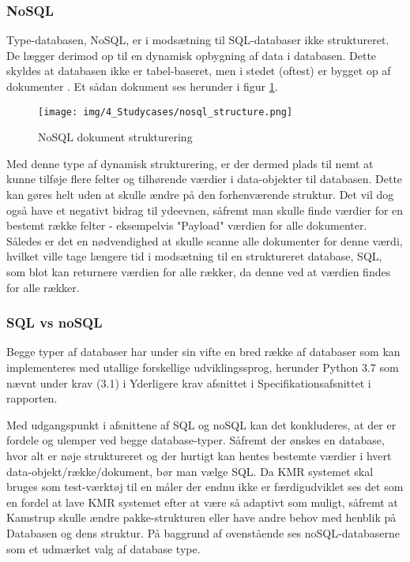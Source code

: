 \begin{appendices}
\subsubsection{NoSQL}
Type-databasen, NoSQL, er i modsætning til SQL-databaser ikke struktureret. De lægger derimod op til en dynamisk opbygning af data i databasen. Dette skyldes at databasen ikke er tabel-baseret, men i stedet (oftest) er bygget op af dokumenter \cite{nosql_explained}. \newline
Et sådan dokument ses herunder i figur \ref{fig:no_sql_document_strukturering}. 

\begin{figure}[H]
	\centering{}
	\texttt{[image: img/4\_Studycases/nosql\_structure.png]}
	\caption{NoSQL dokument strukturering}
	\label{fig:no_sql_document_strukturering}
\end{figure} 

Med denne type af dynamisk strukturering, er der dermed plads til nemt at kunne tilføje flere felter og tilhørende værdier i data-objekter til databasen. Dette kan gøres helt uden at skulle ændre på den forhenværende struktur. Det vil dog også have et negativt bidrag til ydeevnen, såfremt man skulle finde værdier for en bestemt række felter - eksempelvis "Payload" værdien for alle dokumenter. Således er det en nødvendighed at skulle scanne alle dokumenter for denne værdi, hvilket ville tage længere tid i modsætning til en struktureret database, SQL, som blot kan returnere værdien for alle rækker, da denne ved at værdien findes for alle rækker. \cite{nosql_explained}

\subsubsection{SQL vs noSQL}
Begge typer af databaser har under sin vifte en bred række af databaser som kan implementeres med utallige forskellige udviklingssprog, herunder Python 3.7 som nævnt under krav (3.1) i Yderligere krav afsnittet i Specifikationsafsnittet i rapporten.

Med udgangspunkt i afsnittene af SQL og noSQL kan det konkluderes, at der er fordele og ulemper ved begge database-typer.
Såfremt der ønskes en database, hvor alt er nøje struktureret og der hurtigt kan hentes bestemte værdier i hvert data-objekt/række/dokument, bør man vælge SQL.
Da KMR systemet skal bruges som test-værktøj til en måler der endnu ikke er færdigudviklet ses det som en fordel at lave KMR systemet efter at være så adaptivt som muligt, såfremt at Kamstrup skulle ændre pakke-strukturen eller have andre behov med henblik på Databasen og dens struktur. På baggrund af ovenstående ses noSQL-databaserne som et udmærket valg af database type. 


\end{appendices}
